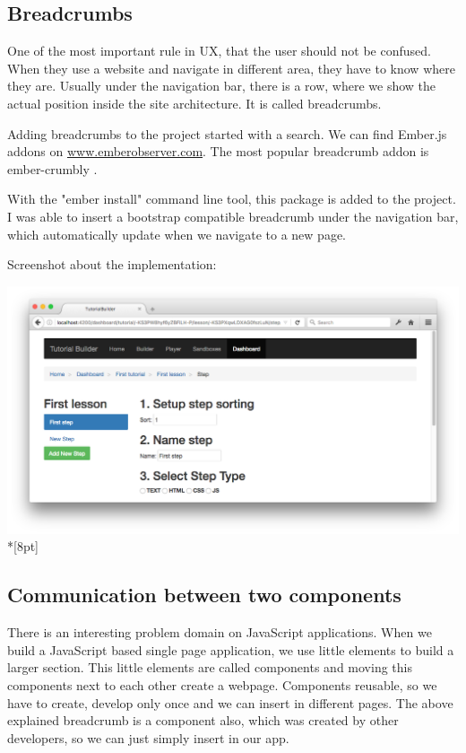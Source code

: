 \documentclass[12pt, a4paper, oneside, openright, medskipamount]{report}
\begin{document}
\subsection{Breadcrumbs}

One of the most important rule in UX, that the user should not be confused. When they use a website and navigate in different area, they have to know where they are. Usually under the navigation bar, there is a row, where we show the actual position inside the site architecture. It is called breadcrumbs.

Adding breadcrumbs to the project started with a search. We can find Ember.js addons on \url{www.emberobserver.com}. The most popular breadcrumb addon is ember-crumbly \cite{ember-crumbly}.

With the "ember install" command line tool, this package is added to the project. I was able to insert a bootstrap compatible breadcrumb under the navigation bar, which automatically update when we navigate to a new page.

Screenshot about the implementation:

\includegraphics[width=1\textwidth]{assets/breadcrumb-screenshot.png}\\*[8pt]

\subsection{Communication between two components}

There is an interesting problem domain on JavaScript applications. When we build a JavaScript based single page application, we use little elements to build a larger section. This little elements are called components and moving this components next to each other create a webpage. Components reusable, so we have to create, develop only once and we can insert in different pages. The above explained breadcrumb is a component also, which was created by other developers, so we can just simply insert in our app.
\end{document}
